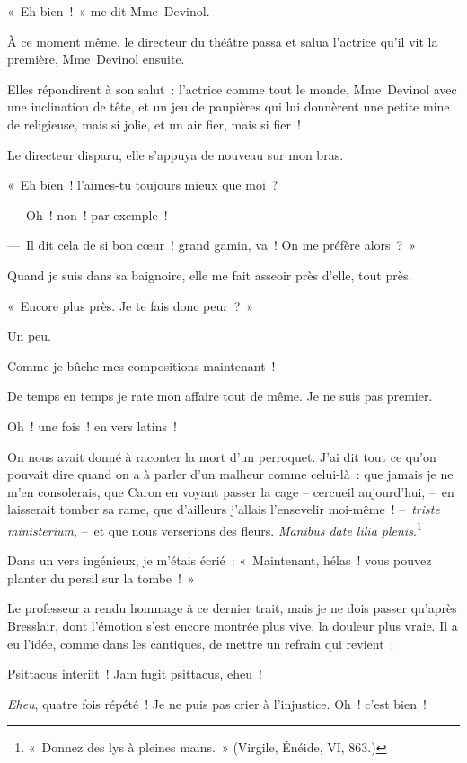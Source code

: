 \documentclass[french,twoside]{book} %
\begin{document}
« Eh bien ! » me dit Mme Devinol.\par
À ce moment même, le directeur du théâtre passa et salua l’actrice qu’il vit la première, Mme Devinol ensuite.\par
Elles répondirent à son salut : l’actrice comme tout le monde, Mme Devinol avec une inclination de tête, et un jeu de paupières qui lui donnèrent une petite mine de religieuse, mais si jolie, et un air fier, mais si fier !\par
Le directeur disparu, elle s’appuya de nouveau sur mon bras.\par
« Eh bien ! l’aimes-tu toujours mieux que moi ?\par
— Oh ! non ! par exemple !\par
— Il dit cela de si bon cœur ! grand gamin, va ! On me préfère alors ? »\par
\bigbreak
\noindent Quand je suis dans sa baignoire, elle me fait asseoir près d’elle, tout près.\par
« Encore plus près. Je te fais donc peur ? »\par
Un peu.\par
\bigbreak
\noindent Comme je bûche mes compositions maintenant !\par
De temps en temps je rate mon affaire tout de même. Je ne suis pas premier.\par
Oh ! une fois ! en vers latins !\par
On nous avait donné à raconter la mort d’un perroquet. J’ai dit tout ce qu’on pouvait dire quand on a à parler d’un malheur comme celui-là : que jamais je ne m’en consolerais, que Caron en voyant passer la cage – cercueil aujourd’hui, – en laisserait tomber sa rame, que d’ailleurs j’allais l’ensevelir moi-même ! – \emph{triste ministerium}, – et que nous verserions des fleurs. \emph{Manibus date lilia plenis}.\footnote{« Donnez des lys à pleines mains. » (Virgile, Énéide, VI, 863.)}\par
Dans un vers ingénieux, je m’étais écrié : « Maintenant, hélas ! vous pouvez planter du persil sur la tombe ! »\par
Le professeur a rendu hommage à ce dernier trait, mais je ne dois passer qu’après Bresslair, dont l’émotion s’est encore montrée plus vive, la douleur plus vraie. Il a eu l’idée, comme dans les cantiques, de mettre un refrain qui revient :\par
Psittacus interiit ! Jam fugit psittacus, eheu !\par
\emph{Eheu}, quatre fois répété ! Je ne puis pas crier à l’injustice. Oh ! c’est bien !\par
\end{document}
